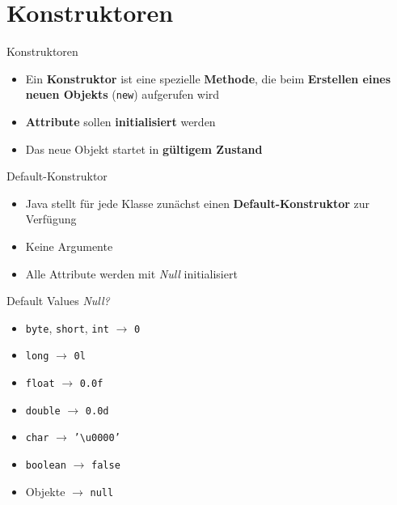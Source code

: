 \documentclass[18pt]{beamer}
\begin{document}
\section{Konstruktoren}

\begin{frame}{Konstruktoren}
    \begin{block}{}
        \begin{itemize}
            \item Ein \textbf{Konstruktor} ist eine spezielle \textbf{Methode}, die beim \textbf{Erstellen eines neuen Objekts} (\texttt{new}) aufgerufen wird
            \item \textbf{Attribute} sollen \textbf{initialisiert} werden
            \item Das neue Objekt startet in \textbf{gültigem Zustand}
        \end{itemize}
    \end{block}


\end{frame}

\begin{frame}{Default-Konstruktor}
    \begin{block}{}
        \begin{itemize}
            \item Java stellt für jede Klasse zunächst einen \textbf{Default-Konstruktor} zur Verfügung
            \item Keine Argumente
            \item Alle Attribute werden mit \textit{Null} initialisiert
        \end{itemize}
    \end{block}



\end{frame}

\begin{frame}[fragile]{Default Values}
    \textit{Null?}
    \vspace{.2in}
    \begin{itemize}
        \item \texttt{byte}, \texttt{short}, \texttt{int} $\rightarrow$ \texttt{0}
        \item \texttt{long} $\rightarrow$ \texttt{0l}
        \item \texttt{float} $\rightarrow$ \texttt{0.0f}
        \item \texttt{double} $\rightarrow$ \texttt{0.0d}
        \item \texttt{char} $\rightarrow$ \texttt{'\textbackslash u0000'}
        \item \texttt{boolean} $\rightarrow$ \texttt{false}
        \item Objekte $\rightarrow$ \texttt{null}
    \end{itemize}

\end{frame}
\end{document}
